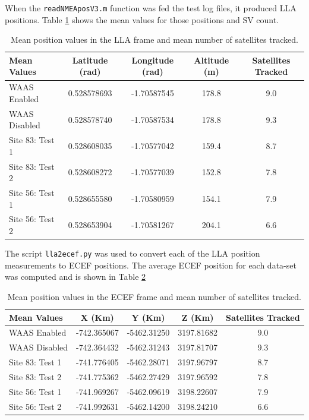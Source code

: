 \documentclass[11pt]{article}
\begin{document}
When the {\tt readNMEAposV3.m} function was fed the test log files, it produced LLA positions. Table \ref{tab:lla} shows the mean values for those positions and SV count.
\\
\begin{table}[h!]
\begin{center}
    \begin{tabular}{  l || c | c | c | c | }
Mean Values & Latitude (rad) & Longitude (rad) & Altitude (m) & Satellites Tracked\\\hline
\hline
WAAS Enabled    & 0.528578693 & -1.70587545 & 178.8 & 9.0 \\\hline
WAAS Disabled   & 0.528578740 & -1.70587534 & 178.8 & 9.3 \\\hline
Site 83: Test 1 & 0.528608035 & -1.70577042 & 159.4 & 8.7 \\\hline
Site 83: Test 2 & 0.528608272 & -1.70577039 & 152.8 & 7.8 \\\hline
Site 56: Test 1 & 0.528655580 & -1.70580959 & 154.1 & 7.9 \\\hline
Site 56: Test 2 & 0.528653904 & -1.70581267 & 204.1 & 6.6 \\\hline
    \end{tabular}
\caption{Mean position values in the LLA frame and mean number of satellites tracked.}
\label{tab:lla}
\end{center}
\end{table}

The script {\tt lla2ecef.py} was used to convert each of the LLA position measurements to ECEF positions. The average ECEF position for each data-set was computed and is shown in Table \ref{tab:ecef}
\\
\begin{table}[h!]
\begin{center}
    \begin{tabular}{  l || c | c | c | c | }
Mean Values & X (Km) & Y (Km) & Z (Km) & Satellites Tracked\\\hline
\hline
WAAS Enabled    & -742.365067 & -5462.31250 &  3197.81682 & 9.0 \\\hline
WAAS Disabled   & -742.364432 & -5462.31243 &  3197.81707 & 9.3 \\\hline
Site 83: Test 1 & -741.776405 & -5462.28071 &  3197.96797 & 8.7 \\\hline
Site 83: Test 2 & -741.775362 & -5462.27429 &  3197.96592 & 7.8 \\\hline
Site 56: Test 1 & -741.969267 & -5462.09619 &  3198.22607 & 7.9 \\\hline
Site 56: Test 2 & -741.992631 & -5462.14200 &  3198.24210 & 6.6 \\\hline
    \end{tabular}
\caption{Mean position values in the ECEF frame and mean number of satellites tracked.}
\label{tab:ecef}
\end{center}
\end{table}
\end{document}
